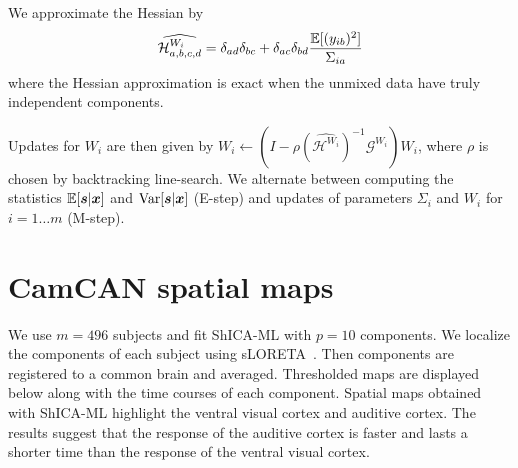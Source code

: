  We approximate the Hessian by
 \begin{align}
 \widehat{\mathcal{H}^{W_i}_{a, b, c, d}} = \delta_{ad} \delta_{bc} + \delta_{ac} \delta_{bd}\frac{\mathbb{E}[(y_{ib})^2]}{\Sigma_{ia}}
\end{align}
where the Hessian approximation is exact when the unmixed data have truly independent components.

Updates for $W_i$ are then given by
$W_i \leftarrow (I - \rho (\widehat{\mathcal{H}^{W_i}})^{-1} \mathcal{G}^{W_i}) W_i$, 
where $\rho$ is chosen by backtracking line-search.
We alternate between computing the statistics $\mathbb{E}[\boldsymbol{s}|\boldsymbol{x}]$ and
$\operatorname*{Var}[\boldsymbol{s}|\boldsymbol{x}]$ (E-step) and updates of parameters $\Sigma_i$ and $W_i$ for $i=1 \dots m$ (M-step).





\section{CamCAN spatial maps}
\label{app:shica:maps}
We use $m=496$ subjects and fit ShICA-ML with $p=10$ components. We localize the
components of each subject using sLORETA~\cite{pascual2002standardized}. Then
components are registered to a common brain and averaged. Thresholded maps are
displayed below along with the time courses of each component. Spatial maps obtained with ShICA-ML highlight the ventral visual cortex and auditive cortex. The results suggest that the response of the auditive cortex is faster and lasts a shorter time than the response of the ventral visual cortex.


